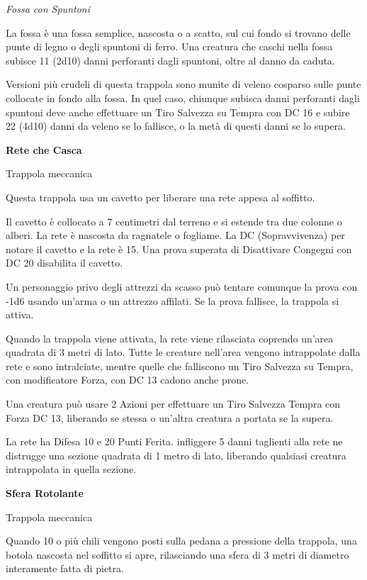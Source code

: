 \begin{multicols}{2}
\medskip

\emph{Fossa con Spuntoni}

La fossa è una fossa semplice, nascosta o a scatto, sul cui fondo si trovano delle punte di legno o degli spuntoni di ferro. Una creatura che caschi nella fossa subisce 11 (2d10) danni perforanti dagli spuntoni, oltre al danno da caduta.

Versioni più crudeli di questa trappola sono munite di veleno cosparso sulle punte collocate in fondo alla fossa. In quel caso, chiunque subisca danni perforanti dagli spuntoni deve anche effettuare un Tiro Salvezza su Tempra con DC 16 e subire 22 (4d10) danni da veleno se lo fallisce, o la metà di questi danni se lo supera.

\medskip

\textbf{Rete che Casca}

Trappola meccanica

Questa trappola usa un cavetto per liberare una rete appesa al soffitto.

Il cavetto è collocato a 7 centimetri dal terreno e si estende tra due colonne o alberi. La rete è nascosta da ragnatele o fogliame. La DC (Sopravvivenza) per notare il cavetto e la rete è 15. Una prova superata di Disattivare Congegni con DC 20 disabilita il cavetto.

Un personaggio privo degli attrezzi da scasso può tentare comunque la prova con -1d6 usando un'arma o un attrezzo affilati. Se la prova fallisce, la trappola si attiva.

Quando la trappola viene attivata, la rete viene rilasciata coprendo un'area quadrata di 3 metri di lato. Tutte le creature nell'area vengono intrappolate dalla rete e sono intralciate, mentre quelle che falliscono un Tiro Salvezza su Tempra, con modificatore Forza, con DC 13 cadono anche prone.

Una creatura può usare 2 Azioni per effettuare un Tiro Salvezza Tempra con Forza DC 13, liberando se stessa o un'altra creatura a portata se la supera.

La rete ha Difesa 10 e 20 Punti Ferita. infliggere 5 danni taglienti alla rete ne distrugge una sezione quadrata di 1 metro di lato, liberando qualsiasi creatura intrappolata in quella sezione.

\medskip

\textbf{Sfera Rotolante}

Trappola meccanica

Quando 10 o più chili vengono posti sulla pedana a pressione della trappola, una botola nascosta nel soffitto si apre, rilasciando una sfera di 3 metri di diametro interamente fatta di pietra.


\end{multicols}
